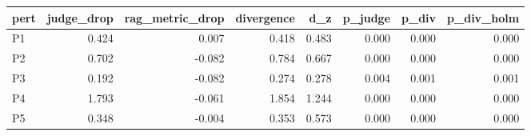 \begin{tabular}{lrrrrrrr}
\toprule
pert & judge_drop & rag_metric_drop & divergence & d_z & p_judge & p_div & p_div_holm \\
\midrule
P1 & 0.424 & 0.007 & 0.418 & 0.483 & 0.000 & 0.000 & 0.000 \\
P2 & 0.702 & -0.082 & 0.784 & 0.667 & 0.000 & 0.000 & 0.000 \\
P3 & 0.192 & -0.082 & 0.274 & 0.278 & 0.004 & 0.001 & 0.001 \\
P4 & 1.793 & -0.061 & 1.854 & 1.244 & 0.000 & 0.000 & 0.000 \\
P5 & 0.348 & -0.004 & 0.353 & 0.573 & 0.000 & 0.000 & 0.000 \\
\bottomrule
\end{tabular}
